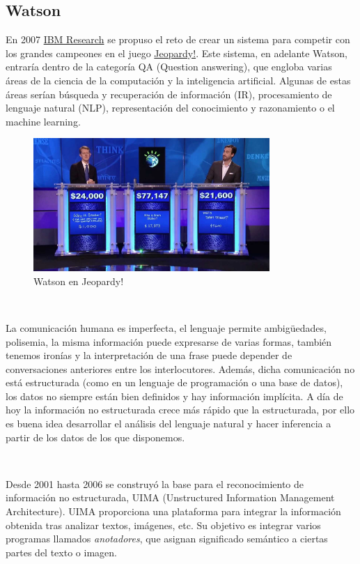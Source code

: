 \documentclass[paper=a4, fontsize=10pt]{scrartcl} %
\numberwithin{equation}{section} %
\numberwithin{figure}{section} %
\numberwithin{table}{section} %
\begin{document}
\subsection{Watson}
En 2007 \href{https://www.research.ibm.com/}{IBM Research} se propuso el reto de crear un sistema para competir con los grandes campeones en el juego \href{https://www.jeopardy.com/}{Jeopardy!}. 
Este sistema, en adelante Watson, entraría dentro de la categoría QA (Question answering), que engloba varias áreas de la ciencia de la computación y la inteligencia artificial. 
Algunas de estas áreas serían búsqueda y recuperación de información (IR), procesamiento de lenguaje natural (NLP), representación del conocimiento y razonamiento o el machine learning.

\begin{figure}[H]
	\centering
	\label{j-watson}
	\includegraphics[width=0.8\textwidth]{./Imagenes/j-watson.jpg}
	\caption{Watson en Jeopardy!}
\end{figure}

\

La comunicación humana es imperfecta, el lenguaje permite ambigüedades, polisemia, la misma información puede expresarse de varias formas, también tenemos ironías y la interpretación de una frase puede depender de conversaciones anteriores entre los interlocutores.
Además, dicha comunicación no está estructurada (como en un lenguaje de programación o una base de datos), los datos no siempre están bien definidos y hay información implícita.
A día de hoy la información no estructurada crece más rápido que la estructurada, por ello es buena idea desarrollar el análisis del lenguaje natural y hacer inferencia a partir de los datos de los que disponemos.

\

Desde 2001 hasta 2006 se construyó la base para el reconocimiento de información no estructurada, UIMA (Unstructured
Information Management Architecture). %
UIMA proporciona una plataforma para integrar la información obtenida tras analizar textos, imágenes, etc.
Su objetivo es integrar varios programas llamados \textit{anotadores}, que asignan significado semántico a ciertas partes del texto o imagen.
\end{document}
